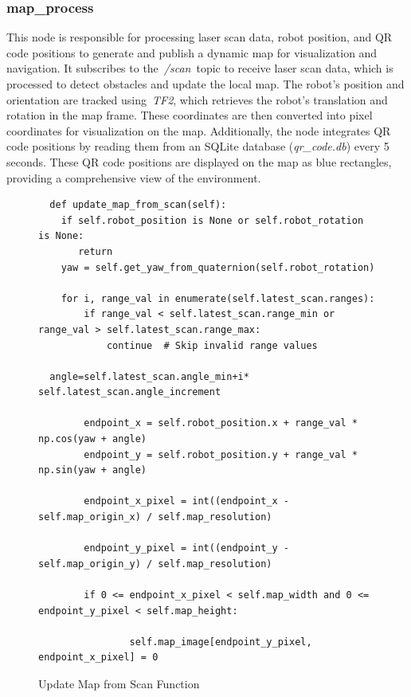 \documentclass[a4paper,12pt]{extreport}
\begin{document}
\subsubsection{map\_process}

This node is responsible for processing laser scan data, robot position,
and QR code positions to generate and publish a dynamic map for
visualization and navigation. It subscribes to the~\emph{/scan}~topic to
receive laser scan data, which is processed to detect obstacles and
update the local map. The robot's position and orientation are tracked
using~\emph{TF2}, which retrieves the robot's translation and rotation
in the map frame. These coordinates are then converted into pixel
coordinates for visualization on the map. Additionally, the node
integrates QR code positions by reading them from an SQLite database
(\emph{qr\_code.db}) every 5 seconds. These QR code positions are
displayed on the map as blue rectangles, providing a comprehensive view
of the environment.

\begin{figure}
  \begin{verbatim}
  def update_map_from_scan(self):
    if self.robot_position is None or self.robot_rotation is None:
       return
    yaw = self.get_yaw_from_quaternion(self.robot_rotation)

    for i, range_val in enumerate(self.latest_scan.ranges):
        if range_val < self.latest_scan.range_min or range_val > self.latest_scan.range_max:
            continue  # Skip invalid range values
            
  angle=self.latest_scan.angle_min+i* self.latest_scan.angle_increment

        endpoint_x = self.robot_position.x + range_val * np.cos(yaw + angle)
        endpoint_y = self.robot_position.y + range_val * np.sin(yaw + angle)

        endpoint_x_pixel = int((endpoint_x - self.map_origin_x) / self.map_resolution)

        endpoint_y_pixel = int((endpoint_y - self.map_origin_y) / self.map_resolution)
            
        if 0 <= endpoint_x_pixel < self.map_width and 0 <= endpoint_y_pixel < self.map_height:
                
                self.map_image[endpoint_y_pixel, endpoint_x_pixel] = 0

\end{verbatim}
\caption{Update Map from Scan Function}
\end{figure}
\end{document}
